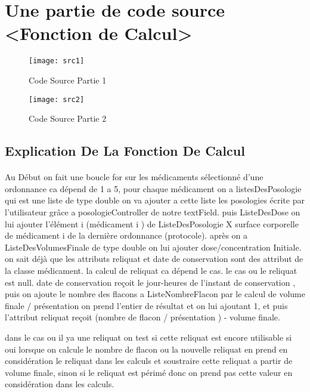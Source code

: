 \documentclass[12pt, openany]{report}
\begin{document}
\section{Une partie de code source <Fonction de Calcul>}
\begin{figure}[!h]
	\centering
	\texttt{[image: src1]}
	\caption{Code Source Partie 1}
	\label{fig:src1}
\end{figure}

\begin{figure}[!h]
	\centering
	\texttt{[image: src2]}
	\caption{Code Source Partie 2}
	\label{fig:src1}
\end{figure}

\subsection{Explication De La Fonction De Calcul}
\paragraph{}
Au Début on fait une boucle for sur les médicaments sélectionné d'une ordonnance ca dépend de 1 a 5, pour chaque médicament on a listesDesPosologie qui est une liste de type double on va ajouter a cette liste les posologies écrite par l'utilisateur grâce a posologieController de notre textField.
puis ListeDesDose on lui ajouter l'élément i (médicament i ) de ListeDesPosologie X surface corporelle de médicament i de la dernière ordonnance (protocole).
après on a ListeDesVolumesFinale de type double on lui ajouter dose/concentration Initiale.
on sait déjà que les attributs reliquat et date de conservation sont des attribut de la classe médicament.
la calcul de reliquat ca dépend le cas.
le cas ou le reliquat est null.
date de conservation reçoit le jour-heures de l'instant de conservation , puis on ajoute le nombre des flacons a  ListeNombreFlacon par le calcul de volume finale / présentation on prend l'entier de résultat et on lui ajoutant 1, et puis l'attribut reliquat reçoit (nombre de flacon / présentation ) - volume finale.

dans le cas ou il ya une reliquat on test si cette reliquat est encore utilisable si oui lorsque on calcule le nombre de flacon ou la nouvelle reliquat en prend en considération le reliquat dans les calculs et soustraire cette reliquat a partir de volume finale, sinon si le reliquat est périmé donc on prend pas cette valeur en considération dans les calculs.
\end{document}
